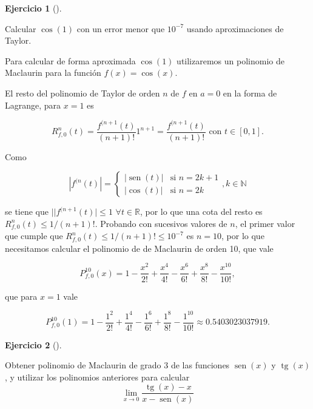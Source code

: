 \documentclass[
  spanish,
  a4paper,
]{scrreport}
\theoremstyle{definition}
\newtheorem{exercise}{Ejercicio}[chapter]
\theoremstyle{remark}
\begin{document}
\begin{exercise}[]\protect\hypertarget{exr-taylor-3}{}\label{exr-taylor-3}

Calcular \(\cos(1)\) con un error menor que \(10^{-7}\) usando
aproximaciones de Taylor.

\end{exercise}

\begin{tcolorbox}[enhanced jigsaw, arc=.35mm, bottomrule=.15mm, bottomtitle=1mm, breakable, colback=white, colbacktitle=quarto-callout-tip-color!10!white, colframe=quarto-callout-tip-color-frame, coltitle=black, left=2mm, leftrule=.75mm, opacityback=0, opacitybacktitle=0.6, rightrule=.15mm, title=\textcolor{quarto-callout-tip-color}{\faLightbulb}\hspace{0.5em}{Solución}, titlerule=0mm, toprule=.15mm, toptitle=1mm]

Para calcular de forma aproximada \(\cos(1)\) utilizaremos un polinomio
de Maclaurin para la función \(f(x)=\cos(x)\).

El resto del polinomio de Taylor de orden \(n\) de \(f\) en \(a=0\) en
la forma de Lagrange, para \(x=1\) es

\[
R^n_{f,0}(t) = \frac{f^{(n+1}(t)}{(n+1)!}1^{n+1} = \frac{f^{(n+1}(t)}{(n+1)!} \mbox{ con }t\in [0,1].
\]

Como

\[|f^{(n}(t)| = 
\begin{cases}
|\operatorname{sen}(t)| & \mbox{si } n=2k+1\\
|\cos(t)| & \mbox{si } n=2k
\end{cases},
k\in\mathbb{N}
\]

se tiene que \(||f^{(n+1}(t)| \leq 1\) \(\forall t\in\mathbb{R}\), por
lo que una cota del resto es \(R^n_{f,0}(t)\leq  1/(n+1)!\). Probando
con sucesivos valores de \(n\), el primer valor que cumple que
\(R^n_{f,0}(t)\leq  1/(n+1)!\leq 10^{-7}\) es \(n=10\), por lo que
necesitamos calcular el polinomio de de Maclaurin de orden 10, que vale

\[
P^{10}_{f,0}(x)= 1-\frac{x^2}{2!}+\frac{x^4}{4!}-\frac{x^6}{6!}+\frac{x^8}{8!}-\frac{x^{10}}{10!},
\]

que para \(x=1\) vale

\[
P^{10}_{f,0}(1)= 1-\frac{1^2}{2!}+\frac{1^4}{4!}-\frac{1^6}{6!}+\frac{1^8}{8!}-\frac{1^{10}}{10!} \approx 0.5403023037919.
\]

\end{tcolorbox}

\begin{exercise}[]\protect\hypertarget{exr-taylor-4}{}\label{exr-taylor-4}

Obtener polinomio de Maclaurin de grado 3 de las funciones
\(\operatorname{sen}(x)\) y \(\operatorname{tg}(x)\), y utilizar los
polinomios anteriores para calcular \[
\lim_{x\rightarrow 0}\frac{\operatorname{tg}(x)-x}{x-\operatorname{sen}(x)}
\]

\end{exercise}
\end{document}

